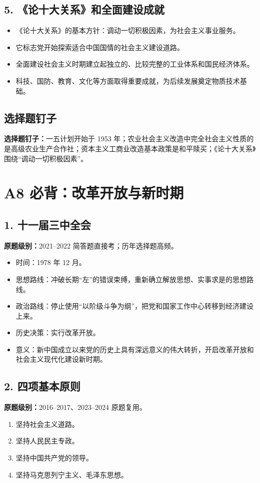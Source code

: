 \documentclass[UTF8,zihao=-4]{ctexart}
\newcommand{\exam}[1]{\textcolor{accent}{\bfseries 原题级别：}#1}
\newcommand{\pin}[1]{\textcolor{main}{\bfseries 选择题钉子：}#1}
\begin{document}
\subsection{5. 《论十大关系》和全面建设成就}
\begin{itemize}
  \item 《论十大关系》的基本方针：调动一切积极因素，为社会主义事业服务。
  \item 它标志党开始探索适合中国国情的社会主义建设道路。
  \item 全面建设社会主义时期建立起独立的、比较完整的工业体系和国民经济体系。
  \item 科技、国防、教育、文化等方面取得重要成就，为后续发展奠定物质技术基础。
\end{itemize}

\subsection{选择题钉子}
\pin{一五计划开始于 1953 年；农业社会主义改造中完全社会主义性质的是高级农业生产合作社；资本主义工商业改造基本政策是和平赎买；《论十大关系》围绕“调动一切积极因素”。}

\newpage

\section{A8 必背：改革开放与新时期}

\subsection{1. 十一届三中全会}
\exam{2021--2022 简答题直接考；历年选择题高频。}
\begin{itemize}
  \item 时间：1978 年 12 月。
  \item 思想路线：冲破长期“左”的错误束缚，重新确立解放思想、实事求是的思想路线。
  \item 政治路线：停止使用“以阶级斗争为纲”，把党和国家工作中心转移到经济建设上来。
  \item 历史决策：实行改革开放。
  \item 意义：新中国成立以来党的历史上具有深远意义的伟大转折，开启改革开放和社会主义现代化建设新时期。
\end{itemize}

\subsection{2. 四项基本原则}
\exam{2016--2017、2023--2024 原题复用。}
\begin{enumerate}
  \item 坚持社会主义道路。
  \item 坚持人民民主专政。
  \item 坚持中国共产党的领导。
  \item 坚持马克思列宁主义、毛泽东思想。
\end{enumerate}
\end{document}

